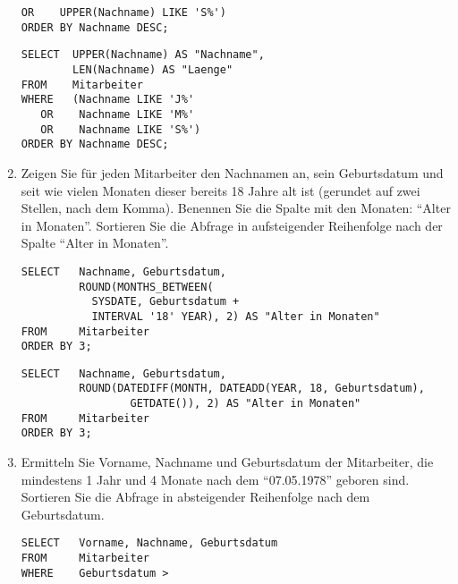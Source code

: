 \begin{enumerate}
\begin{lstlisting}[language=oracle_sql]
   OR    UPPER(Nachname) LIKE 'S%')
ORDER BY Nachname DESC;
        \end{lstlisting}
        \begin{mssql}[\FALSE]
        \end{mssql}
        \begin{lstlisting}[language=ms_sql]
SELECT  UPPER(Nachname) AS "Nachname",
        LEN(Nachname) AS "Laenge"
FROM    Mitarbeiter
WHERE   (Nachname LIKE 'J%'
   OR    Nachname LIKE 'M%'
   OR    Nachname LIKE 'S%')
ORDER BY Nachname DESC;
        \end{lstlisting}
        \item Zeigen Sie f\"ur jeden Mitarbeiter den Nachnamen an, sein
        Geburtsdatum und seit wie vielen Monaten dieser bereits 18 Jahre alt ist
        (gerundet auf zwei Stellen, nach dem Komma). Benennen Sie die Spalte mit
        den Monaten: \enquote{Alter in Monaten}. Sortieren Sie die Abfrage in
        aufsteigender Reihenfolge nach der Spalte \enquote{Alter in Monaten}.
        \begin{oraclesql}[\FALSE]
        \end{oraclesql}
        \begin{lstlisting}[language=oracle_sql]
SELECT   Nachname, Geburtsdatum,
         ROUND(MONTHS_BETWEEN(
           SYSDATE, Geburtsdatum + 
           INTERVAL '18' YEAR), 2) AS "Alter in Monaten"
FROM     Mitarbeiter
ORDER BY 3;
       \end{lstlisting}
\clearpage
        \begin{mssql}[\FALSE]
        \end{mssql}
        \begin{lstlisting}[language=ms_sql]
SELECT   Nachname, Geburtsdatum,
         ROUND(DATEDIFF(MONTH, DATEADD(YEAR, 18, Geburtsdatum),
                 GETDATE()), 2) AS "Alter in Monaten"
FROM     Mitarbeiter
ORDER BY 3;
        \end{lstlisting}
        \item Ermitteln Sie Vorname, Nachname und Geburtsdatum der Mitarbeiter,
        die mindestens 1 Jahr und 4 Monate nach dem \enquote{07.05.1978} geboren
        sind. Sortieren Sie die Abfrage in absteigender Reihenfolge nach dem
        Geburtsdatum.
        \begin{oraclesql}[\FALSE]
        \end{oraclesql}
        \begin{lstlisting}[language=oracle_sql]
SELECT   Vorname, Nachname, Geburtsdatum
FROM     Mitarbeiter
WHERE    Geburtsdatum >

\end{lstlisting}
\end{enumerate}
